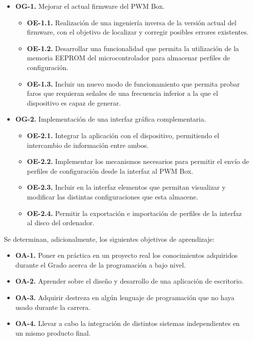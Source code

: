 \begin{itemize}
    \item\textbf{OG-1.} Mejorar el actual firmware del PWM Box.
    \begin{itemize}
        \item\textbf{OE-1.1.} Realización de una ingeniería inversa de la versión actual del firmware, con el objetivo de localizar y corregir posibles errores existentes.
        \item\textbf{OE-1.2.} Desarrollar una funcionalidad que permita la utilización de la memoria EEPROM del microcontrolador para almacenar perfiles de configuración.
        \item\textbf{OE-1.3.} Incluir un nuevo modo de funcionamiento que permita probar faros que requieran señales de una frecuencia inferior a la que el dispositivo es capaz de generar.
    \end{itemize}
    \item\textbf{OG-2.} Implementación de una interfaz gráfica complementaria.
    \begin{itemize}
        \item\textbf{OE-2.1.} Integrar la aplicación con el dispositivo, permitiendo el intercambio de información entre ambos.
        \item\textbf{OE-2.2.} Implementar los mecanismos necesarios para permitir el envío de perfiles de configuración desde la interfaz al PWM Box.
        \item\textbf{OE-2.3.} Incluir en la interfaz elementos que permitan visualizar y modificar las distintas configuraciones que esta almacene.
        \item\textbf{OE-2.4.} Permitir la exportación e importación de perfiles de la interfaz al disco del ordenador.
    \end{itemize}
\end{itemize}

Se determinan, adicionalmente, los siguientes objetivos de aprendizaje:

\begin{itemize}
    \item\textbf{OA-1.} Poner en práctica en un proyecto real los conocimientos adquiridos durante el Grado acerca de la programación a bajo nivel.
    \item\textbf{OA-2.} Aprender sobre el diseño y desarrollo de una aplicación de escritorio.
    \item\textbf{OA-3.} Adquirir destreza en algún lenguaje de programación que no haya usado durante la carrera.
    \item\textbf{OA-4.} Llevar a cabo la integración de distintos sistemas independientes en un mismo producto final.
\end{itemize}

